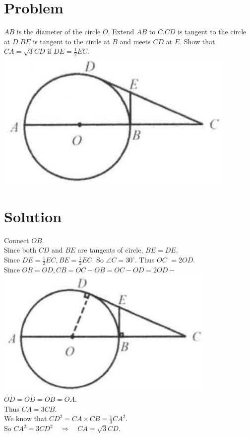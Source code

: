 \documentclass{article}
\begin{document}
\section*{Problem}
\(A B\) is the diameter of the circle \(O\). Extend \(A B\) to \(C . C D\) is tangent to the circle at \(D . B E\) is tangent to the circle at \(B\) and meets \(C D\) at \(E\). Show that \(C A=\sqrt{3} C D\) if \(D E=\frac{1}{2} E C\).\\
\centering
\includegraphics[width=\textwidth]{images/155(2).jpg}

\section*{Solution}
Connect \(O B\).\\
Since both \(C D\) and \(B E\) are tangents of circle, \(B E=D E\).\\
Since \(D E=\frac{1}{2} E C, B E=\frac{1}{2} E C\). So \(\angle C=30^{\circ}\). Thus \(O C\) \(=2 O D\).\\
Since \(O B=O D, C B=O C-O B=O C-O D=2 O D-\)\\
\centering
\includegraphics[width=\textwidth]{images/158(2).jpg}\\
\(O D=O D=O B=O A\).\\
Thus \(C A=3 C B\).\\
We know that \(C D^{2}=C A \times C B=\frac{1}{3} C A^{2}\).\\
So \(C A^{2}=3 C D^{2} \quad \Rightarrow \quad C A=\sqrt{3} C D\).
\end{document}
